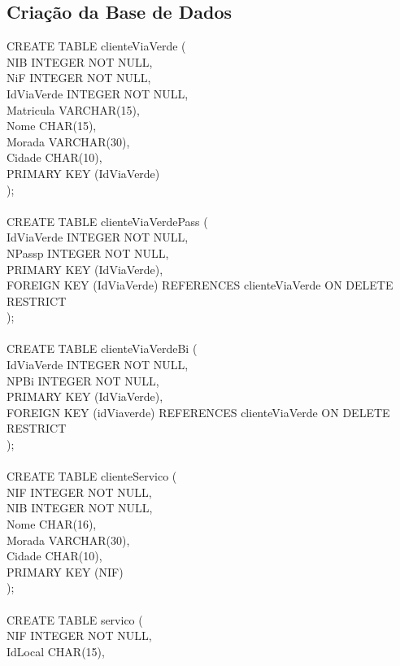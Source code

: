 \documentclass[a4paper]{article}
\begin{document}
\newpage

\subsection{Criação da Base de Dados}

CREATE TABLE clienteViaVerde (\\
NIB INTEGER NOT NULL,\\
NiF INTEGER NOT NULL,\\
IdViaVerde INTEGER NOT NULL,\\
Matricula VARCHAR(15),\\
Nome CHAR(15),\\
Morada VARCHAR(30),\\
Cidade CHAR(10),\\
PRIMARY KEY (IdViaVerde)\\
);\\
\\
CREATE TABLE clienteViaVerdePass (\\
IdViaVerde INTEGER NOT NULL,\\
NPassp INTEGER NOT NULL,\\
PRIMARY KEY (IdViaVerde),\\
FOREIGN KEY (IdViaVerde) REFERENCES clienteViaVerde ON DELETE RESTRICT\\
);\\
\\
CREATE TABLE clienteViaVerdeBi (\\
IdViaVerde INTEGER NOT NULL,\\
NPBi INTEGER NOT NULL,\\
PRIMARY KEY (IdViaVerde),\\
FOREIGN KEY (idViaverde) REFERENCES clienteViaVerde ON DELETE RESTRICT\\
);\\
\\
CREATE TABLE clienteServico (\\
NIF INTEGER NOT NULL,\\
NIB INTEGER NOT NULL,\\
Nome CHAR(16),\\
Morada VARCHAR(30),\\
Cidade CHAR(10),\\
PRIMARY KEY (NIF)\\
);\\
\\
CREATE TABLE servico (\\
NIF INTEGER NOT NULL,\\
IdLocal CHAR(15),\\
\end{document}
